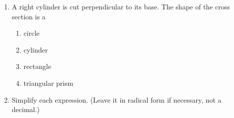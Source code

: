 \documentclass[12pt, twoside]{article}
\begin{document}
\begin{enumerate}
 \item A right cylinder is cut perpendicular to its base. The shape of the cross section is a
  \begin{enumerate}
    \item circle
    \item cylinder
    \item rectangle
    \item triangular prism
  \end{enumerate} \vspace{1cm}

 \item Simplify each expression. (Leave it in radical form if necessary, not a decimal.)
  \begin{enumerate}
  \end{enumerate}

\end{enumerate}
\end{document}
